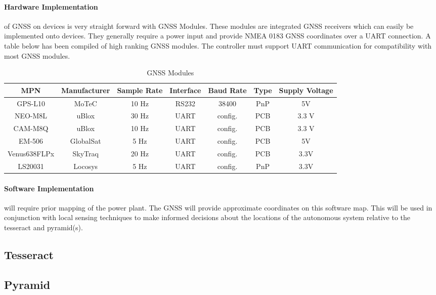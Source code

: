 \documentclass[12pt]{article}
\begin{document}
\paragraph{Hardware Implementation} of GNSS on devices is very straight forward with GNSS Modules. These modules are integrated GNSS receivers which can easily be implemented onto devices. They generally require a power input and provide NMEA 0183 GNSS coordinates over a UART connection. A table below has been compiled of high ranking GNSS modules. The controller must support UART communication for compatibility with most GNSS modules.

\begin{table}[htbp]
  \centering
  \caption{GNSS Modules}
    \begin{tabular}{c|c|c|c|c|c|c}
    MPN   & Manufacturer & Sample Rate & Interface & Baud Rate & Type& Supply Voltage \\
    \midrule
    GPS-L10 & MoTeC & 10 Hz & RS232 & 38400 &     PnP  & 5V \\
    NEO-M8L & uBlox & 30 Hz & UART  & config. &    PCB   & 3.3 V \\
    CAM-M8Q & uBlox & 10 Hz & UART  & config. & PCB & 3.3 V \\
    EM-506 & GlobalSat & 5 Hz & UART  & config. & PCB & 5V \\
    Venus638FLPx & SkyTraq & 20 Hz & UART  & config. & PCB & 3.3V \\
    LS20031 & Locosys & 5 Hz  & UART  & config. & PnP & 3.3V \\
    \end{tabular}%
  \label{tab:addlabel}%
\end{table}%

\paragraph{Software Implementation} will require prior mapping of the power plant. The GNSS will provide approximate coordinates on this software map. This will be used in conjunction with local sensing techniques to make informed decisions about the locations of the autonomous system relative to the tesseract and pyramid(s).


\subsection{Tesseract}

\subsection{Pyramid}
\end{document}
